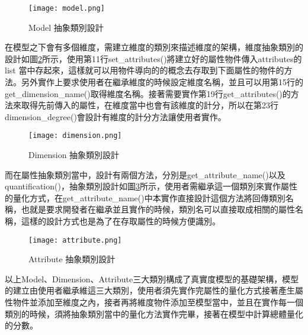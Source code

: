 \begin{figure}[H]
\centering
\graphicspath{{/Users/FUDA/Documents/masterThesis/image/}}
\texttt{[image: model.png]}
\caption{Model 抽象類別設計}
\label{model}
\end{figure}

在模型之下會有多個維度，需建立維度的類別來描述維度的架構，維度抽象類別的設計如圖\ref{dimension}所示，使用第11行set\_attributes()將建立好的屬性物件傳入attributes的 list 當中存起來，這樣就可以用物件導向的的概念去存取到下面屬性的物件的方法。另外實作上要求使用者在繼承維度的時候設定維度名稱，並且可以用第15行的get\_dimension\_name()取得維度名稱。接著需要實作第19行get\_attributes()的方法來取得先前傳入的屬性，在維度當中也會有該維度的計分，所以在第23行dimension\_degree()會設計有維度的計分方法讓使用者實作。

\begin{figure}[H]
\centering
\graphicspath{{/Users/FUDA/Documents/masterThesis/image/}}
\texttt{[image: dimension.png]}
\caption{Dimension 抽象類別設計}
\label{dimension}
\end{figure}

而在屬性抽象類別當中，設計有兩個方法，分別是get\_attribute\_name()以及quantification()，抽象類別設計如圖\ref{attribute}所示，使用者需繼承這一個類別來實作屬性的量化方式，在get\_attribute\_name()中本實作直接設計這個方法將回傳類別名稱，也就是要求開發者在繼承並且實作的時候，類別名可以直接取成相關的屬性名稱，這樣的設計方式也是為了在存取屬性的時候方便識別。\\\par
\newpage
\begin{figure}[H]
\centering
\graphicspath{{/Users/FUDA/Documents/masterThesis/image/}}
\texttt{[image: attribute.png]}
\caption{Attribute 抽象類別設計}
\label{attribute}
\end{figure}
以上Model、Dimension、Attribute三大類別構成了真實度模型的基礎架構，模型的建立由使用者繼承維這三大類別，使用者須先實作完屬性的量化方式接著產生屬性物件並添加至維度之內，接者再將維度物件添加至模型當中，並且在實作每一個類別的時候，須將抽象類別當中的量化方法實作完畢，接著在模型中計算總體量化的分數。\\\par